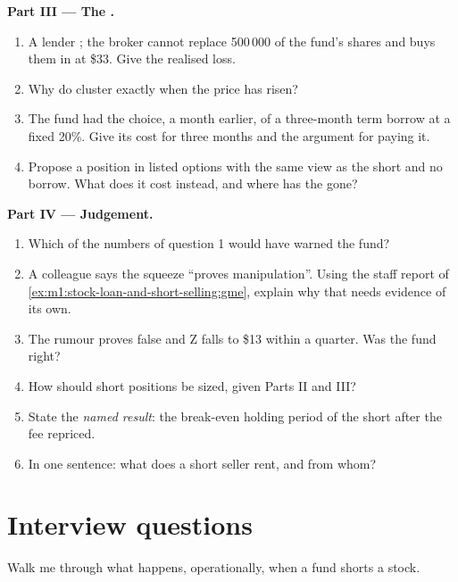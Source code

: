 \begin{problem}
\medskip\noindent\textbf{Part III --- The .}
\begin{enumerate}[resume]
\item A lender ; the broker cannot replace 500\,000 of the fund's
shares and buys them in at \$33. Give the realised loss.
\item Why do  cluster exactly when the price has risen?
\item The fund had the choice, a month earlier, of a three-month term borrow
at a fixed 20\%. Give its cost for three months and the argument for paying
it.
\item Propose a position in listed options with the same view as the short
and no borrow. What does it cost instead, and where has the  gone?
\end{enumerate}

\medskip\noindent\textbf{Part IV --- Judgement.}
\begin{enumerate}[resume]
\item Which of the numbers of question 1 would have warned the fund?
\item A colleague says the squeeze ``proves manipulation''. Using the staff
report of \cref{ex:m1:stock-loan-and-short-selling:gme}, explain why that
needs evidence of its own.
\item The rumour proves false and Z falls to \$13 within a quarter. Was the
fund right?
\item How should short positions be sized, given Parts II and III?
\item State the \emph{named result}: the break-even holding period of the
short after the fee repriced.
\item In one sentence: what does a short seller rent, and from whom?
\end{enumerate}
\end{problem}

\section{Interview questions}

\begin{interviewq}\label{iq:m1:stock-loan-and-short-selling:1}
Walk me through what happens, operationally, when a fund shorts a stock.
\end{interviewq}

